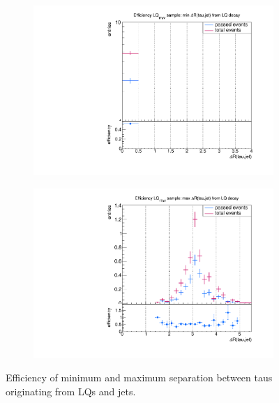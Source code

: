 \begin{figure}
\begin{subfigure}[t]{0.49\textwidth}
                \label{dRFromLQ:signal:taujet:maxLQ75}
                \end{subfigure}
                \begin{subfigure}[t]{0.49\textwidth}
                \includegraphics[width=\textwidth]{figures/plots/LQ76/Divided_fromLQ_mindR_taujet.pdf}
                \label{dRFromLQ:signal:taujet:minLQ76}
                \end{subfigure}
                \begin{subfigure}[t]{0.49\textwidth}
                \includegraphics[width=\textwidth]{figures/plots/LQ76/Divided_maxdR_fromLQ_taujet.pdf}
                \label{dRFromLQ:signal:taujet:maxLQ76}
                \end{subfigure}
\caption[Efficiency of separation between taus originating from LQs and jets.]{Efficiency of minimum and maximum separation between taus originating from LQs and jets.}
\label{dRFromLQ:signal:taujet}
\end{figure}
